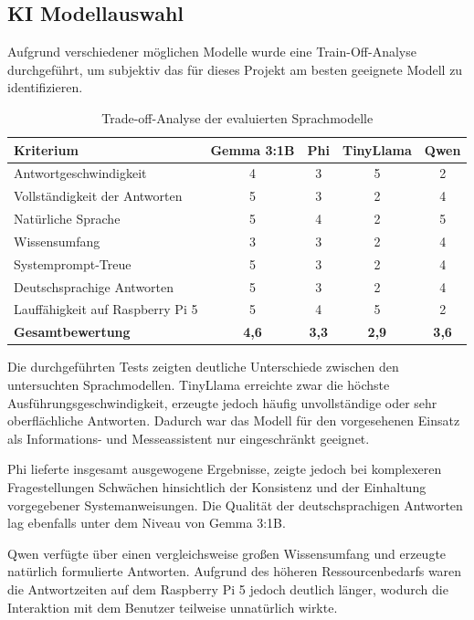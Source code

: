 \subsection*{KI Modellauswahl}

Aufgrund verschiedener möglichen Modelle wurde eine Train-Off-Analyse  durchgeführt, um subjektiv das für dieses Projekt am besten geeignete Modell zu identifizieren. 

\begin{table}[H]
	\centering
	
	\begin{tabular}{|p{5.5cm}|c|c|c|c|}
		\hline
		\textbf{Kriterium} &
		\textbf{Gemma 3:1B} &
		\textbf{Phi} &
		\textbf{TinyLlama} &
		\textbf{Qwen} \\
		\hline
		Antwortgeschwindigkeit & 4 & 3 & 5 & 2 \\
		Vollständigkeit der Antworten & 5 & 3 & 2 & 4 \\
		Natürliche Sprache & 5 & 4 & 2 & 5 \\
		Wissensumfang & 3 & 3 & 2 & 4 \\
		Systemprompt-Treue & 5 & 3 & 2 & 4 \\
		Deutschsprachige Antworten & 5 & 3 & 2 & 4 \\
		Lauffähigkeit auf Raspberry Pi 5 & 5 & 4 & 5 & 2 \\
		\hline
		\textbf{Gesamtbewertung} & \textbf{4,6} & \textbf{3,3} & \textbf{2,9} & \textbf{3,6} \\
		\hline
	\end{tabular}
	\caption{Trade-off-Analyse der evaluierten Sprachmodelle}
	\label{tab:llm_vergleich}
	\renewcommand{\arraystretch}{1.2}
\end{table}

Die durchgeführten Tests zeigten deutliche Unterschiede zwischen den untersuchten Sprachmodellen. TinyLlama erreichte zwar die höchste Ausführungsgeschwindigkeit, erzeugte jedoch häufig unvollständige oder sehr oberflächliche Antworten. Dadurch war das Modell für den vorgesehenen Einsatz als Informations- und Messeassistent nur eingeschränkt geeignet.

Phi lieferte insgesamt ausgewogene Ergebnisse, zeigte jedoch bei komplexeren Fragestellungen Schwächen hinsichtlich der Konsistenz und der Einhaltung vorgegebener Systemanweisungen. Die Qualität der deutschsprachigen Antworten lag ebenfalls unter dem Niveau von Gemma 3:1B.

Qwen verfügte über einen vergleichsweise großen Wissensumfang und erzeugte natürlich formulierte Antworten. Aufgrund des höheren Ressourcenbedarfs waren die Antwortzeiten auf dem Raspberry Pi 5 jedoch deutlich länger, wodurch die Interaktion mit dem Benutzer teilweise unnatürlich wirkte.

